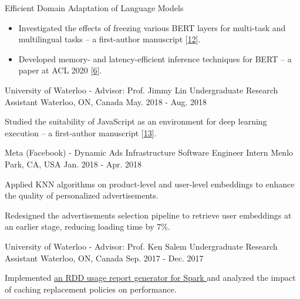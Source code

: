 \begin{cventries}
{\begin{cvitems}
\item {Efficient Domain Adaptation of Language Models}
\begin{itemize}[label=$\cdot$,leftmargin=0.7em]
\item {Investigated the effects of freezing various BERT layers for multi-task and multilingual tasks -- a first-author manuscript [\hyperlink{Elsa:arXiv}{12}].}
\item {Developed memory- and latency-efficient inference techniques for BERT -- a paper at ACL 2020 [\hyperlink{DeeBERT:ACL}{6}].}
\end{itemize}
\end{cvitems}
}
\cventry
{University of Waterloo - Advisor: Prof. Jimmy Lin} %
{Undergraduate Research Assistant} %
{Waterloo, ON, Canada} %
{May. 2018 - Aug. 2018} %
{ %
\begin{cvitems}
\item {Studied the suitability of JavaScript as an environment for deep learning execution -- a first-author manuscript [\hyperlink{JavaScript:arXiv}{13}].}
\end{cvitems}
}
\cventry
{Meta (Facebook) - Dynamic Ads Infrastructure} %
{Software Engineer Intern} %
{Menlo Park, CA, USA} %
{Jan. 2018 - Apr. 2018} %
{ %
\begin{cvitems}
\item {Applied KNN algorithms on product-level and user-level embeddings to enhance the quality of personalized advertisements.}
\item {Redesigned the advertisements selection pipeline to retrieve user embeddings at an earlier stage, reducing loading time by 7\%.}
\end{cvitems}
}
\cventry
{University of Waterloo - Advisor: Prof. Ken Salem} %
{Undergraduate Research Assistant} %
{Waterloo, ON, Canada} %
{Sep. 2017 - Dec. 2017} %
{ %
\begin{cvitems}
\item {Implemented \href{https://github.com/ljj7975/CachedRDDReportGenerator}{an RDD usage report generator for Spark {\small \faGithub}} and analyzed the impact of caching replacement policies on performance.}
\end{cvitems}
}
\end{cventries}
